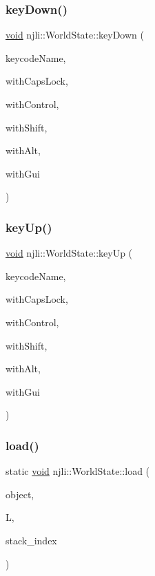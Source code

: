 \subsubsection{\texorpdfstring{key\+Down()}{keyDown()}}
{\footnotesize\ttfamily \mbox{\hyperlink{_thread_8h_af1e856da2e658414cb2456cb6f7ebc66}{void}} njli\+::\+World\+State\+::key\+Down (\begin{DoxyParamCaption}\item[{const char $\ast$}]{keycode\+Name,  }\item[{bool}]{with\+Caps\+Lock,  }\item[{bool}]{with\+Control,  }\item[{bool}]{with\+Shift,  }\item[{bool}]{with\+Alt,  }\item[{bool}]{with\+Gui }\end{DoxyParamCaption})}

\mbox{\label{classnjli_1_1_world_state_aae2e57b0dc2729fea3a20359deea8279}} 
\subsubsection{\texorpdfstring{key\+Up()}{keyUp()}}
{\footnotesize\ttfamily \mbox{\hyperlink{_thread_8h_af1e856da2e658414cb2456cb6f7ebc66}{void}} njli\+::\+World\+State\+::key\+Up (\begin{DoxyParamCaption}\item[{const char $\ast$}]{keycode\+Name,  }\item[{bool}]{with\+Caps\+Lock,  }\item[{bool}]{with\+Control,  }\item[{bool}]{with\+Shift,  }\item[{bool}]{with\+Alt,  }\item[{bool}]{with\+Gui }\end{DoxyParamCaption})}

\mbox{\label{classnjli_1_1_world_state_ad8dd1637df165f9886d11c3e8b6d1cb7}} 
\subsubsection{\texorpdfstring{load()}{load()}}
{\footnotesize\ttfamily static \mbox{\hyperlink{_thread_8h_af1e856da2e658414cb2456cb6f7ebc66}{void}} njli\+::\+World\+State\+::load (\begin{DoxyParamCaption}\item[{\mbox{\hyperlink{classnjli_1_1_world_state}{World\+State}} \&}]{object,  }\item[{lua\+\_\+\+State $\ast$}]{L,  }\item[{int}]{stack\+\_\+index }\end{DoxyParamCaption})\hspace{0.3cm}{\ttfamily [static]}}

